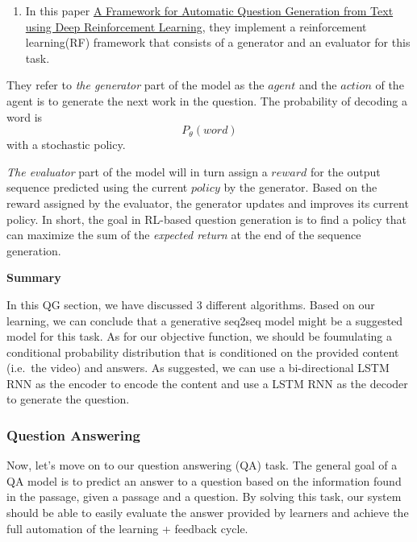 \documentclass{acm_proc_article-sp}
\renewcommand{\paragraph}[1]{\vskip 6pt\noindent\textbf{#1 }}
\providecommand{\tightlist}{%
  \setlength{\itemsep}{0pt}\setlength{\parskip}{0pt}}
\begin{document}
\begin{enumerate}
\def\labelenumi{\arabic{enumi}.}
\setcounter{enumi}{2}
\tightlist
\item
  In this paper \href{https://arxiv.org/pdf/1808.04961.pdf}{A Framework
  for Automatic Question Generation from Text using Deep Reinforcement
  Learning}, they implement a reinforcement learning(RF) framework that
  consists of a generator and an evaluator for this task.
\end{enumerate}

They refer to \emph{the generator} part of the model as the \(agent\)
and the \(action\) of the agent is to generate the next work in the
question. The probability of decoding a word is \[P_{\theta}(word)\]
with a stochastic policy.

\emph{The evaluator} part of the model will in turn assign a \(reward\)
for the output sequence predicted using the current \(policy\) by the
generator. Based on the reward assigned by the evaluator, the generator
updates and improves its current policy. In short, the goal in RL-based
question generation is to find a policy that can maximize the sum of the
\emph{expected return} at the end of the sequence generation.

\paragraph{Summary}\label{summary}

In this QG section, we have discussed 3 different algorithms. Based on
our learning, we can conclude that a generative seq2seq model might be a
suggested model for this task. As for our objective function, we should
be foumulating a conditional probability distribution that is
conditioned on the provided content (i.e.~the video) and answers. As
suggested, we can use a bi-directional LSTM RNN as the encoder to encode
the content and use a LSTM RNN as the decoder to generate the question.

\subsubsection{Question Answering}\label{question-answering}

Now, let's move on to our question answering (QA) task. The general goal
of a QA model is to predict an answer to a question based on the
information found in the passage, given a passage and a question. By
solving this task, our system should be able to easily evaluate the
answer provided by learners and achieve the full automation of the
learning + feedback cycle.
\end{document}
